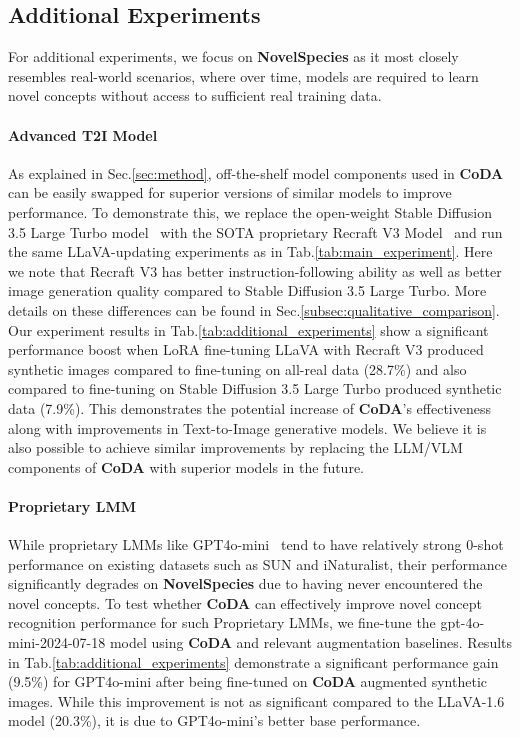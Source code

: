 \subsection{Additional Experiments}

For additional experiments, we focus on \textbf{NovelSpecies} as it most closely resembles real-world scenarios, where over time, models are required to learn novel concepts without access to sufficient real training data.

\vspace{-0.9em}
\paragraph*{Advanced T2I Model}

As explained in Sec.\ref{sec:method}, off-the-shelf model components used in \textbf{CoDA} can be easily swapped for superior versions of similar models to improve performance. To demonstrate this, we replace the open-weight Stable Diffusion 3.5 Large Turbo model~\citep{stablediffusion3.5} with the SOTA proprietary Recraft V3 Model~\cite{2024RecraftV3} and run the same LLaVA-updating experiments as in Tab.\ref{tab:main_experiment}. Here we note that Recraft V3 has better instruction-following ability as well as better image generation quality compared to Stable Diffusion 3.5 Large Turbo. More details on these differences can be found in Sec.\ref{subsec:qualitative_comparison}. Our experiment results in Tab.\ref{tab:additional_experiments} show a significant performance boost when LoRA fine-tuning LLaVA with Recraft V3 produced synthetic images compared to fine-tuning on all-real data (28.7\%) and also compared to fine-tuning on Stable Diffusion 3.5 Large Turbo produced synthetic data (7.9\%). This demonstrates the potential increase of \textbf{CoDA}'s effectiveness along with improvements in Text-to-Image generative models. We believe it is also possible to achieve similar improvements by replacing the LLM/VLM components of \textbf{CoDA} with superior models in the future.


\vspace{-0.9em}
\paragraph*{Proprietary LMM}

While proprietary LMMs like GPT4o-mini~\cite{hurst2024gpt4o} tend to have relatively strong 0-shot performance on existing datasets such as SUN and iNaturalist, their performance significantly degrades on \textbf{NovelSpecies} due to having never encountered the novel concepts. To test whether \textbf{CoDA} can effectively improve novel concept recognition performance for such Proprietary LMMs, we fine-tune the gpt-4o-mini-2024-07-18 model using \textbf{CoDA} and relevant augmentation baselines. Results in Tab.\ref{tab:additional_experiments} demonstrate a significant performance gain (9.5\%) for GPT4o-mini after being fine-tuned on \textbf{CoDA} augmented synthetic images. While this improvement is not as significant compared to the LLaVA-1.6 model (20.3\%), it is due to GPT4o-mini's better base performance.


